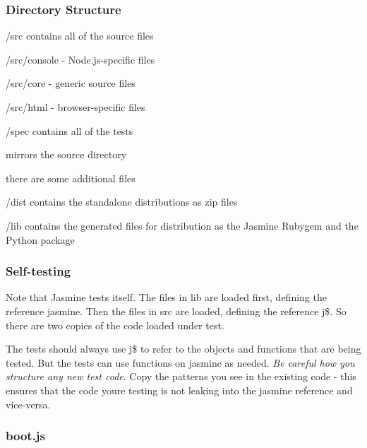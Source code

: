 \subsubsection*{Directory Structure}


\begin{DoxyItemize}
\item {\ttfamily /src} contains all of the source files
\begin{DoxyItemize}
\item {\ttfamily /src/console} -\/ Node.\+js-\/specific files
\item {\ttfamily /src/core} -\/ generic source files
\item {\ttfamily /src/html} -\/ browser-\/specific files
\end{DoxyItemize}
\item {\ttfamily /spec} contains all of the tests
\begin{DoxyItemize}
\item mirrors the source directory
\item there are some additional files
\end{DoxyItemize}
\item {\ttfamily /dist} contains the standalone distributions as zip files
\item {\ttfamily /lib} contains the generated files for distribution as the Jasmine Rubygem and the Python package
\end{DoxyItemize}

\subsubsection*{Self-\/testing}

Note that Jasmine tests itself. The files in {\ttfamily lib} are loaded first, defining the reference {\ttfamily jasmine}. Then the files in {\ttfamily src} are loaded, defining the reference {\ttfamily j\$}. So there are two copies of the code loaded under test.

The tests should always use {\ttfamily j\$} to refer to the objects and functions that are being tested. But the tests can use functions on {\ttfamily jasmine} as needed. {\itshape Be careful how you structure any new test code}. Copy the patterns you see in the existing code -\/ this ensures that the code you\textquotesingle{}re testing is not leaking into the {\ttfamily jasmine} reference and vice-\/versa.

\subsubsection*{{\ttfamily boot.\+js}}

